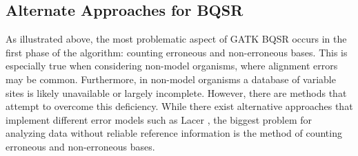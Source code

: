 \subsection{Alternate Approaches for BQSR}
As illustrated above, the most problematic aspect of GATK BQSR occurs in the first phase of the algorithm: counting erroneous and non-erroneous bases. This is especially true when considering non-model organisms, where alignment errors may be common. Furthermore, in non-model organisms a database of variable sites is likely unavailable or largely incomplete. However, there are methods that attempt to overcome this deficiency. While there exist alternative approaches that implement different error models such as Lacer \parencite{chung_lacer:_2017}, the biggest problem for analyzing data without reliable reference information is the method of counting erroneous and non-erroneous bases.

